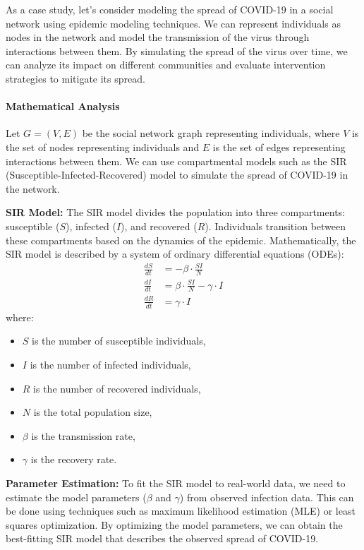 \documentclass[12pt]{book} %
\begin{document}
As a case study, let's consider modeling the spread of COVID-19 in a social network using epidemic modeling techniques. We can represent individuals as nodes in the network and model the transmission of the virus through interactions between them. By simulating the spread of the virus over time, we can analyze its impact on different communities and evaluate intervention strategies to mitigate its spread.

\paragraph{Mathematical Analysis}

Let \(G = (V, E)\) be the social network graph representing individuals, where \(V\) is the set of nodes representing individuals and \(E\) is the set of edges representing interactions between them. We can use compartmental models such as the SIR (Susceptible-Infected-Recovered) model to simulate the spread of COVID-19 in the network.

\textbf{SIR Model:} The SIR model divides the population into three compartments: susceptible (\(S\)), infected (\(I\)), and recovered (\(R\)). Individuals transition between these compartments based on the dynamics of the epidemic. Mathematically, the SIR model is described by a system of ordinary differential equations (ODEs):
\[
\begin{aligned}
\frac{dS}{dt} &= -\beta \cdot \frac{SI}{N} \\
\frac{dI}{dt} &= \beta \cdot \frac{SI}{N} - \gamma \cdot I \\
\frac{dR}{dt} &= \gamma \cdot I
\end{aligned}
\]
where:
\begin{itemize}
    \item \(S\) is the number of susceptible individuals,
    \item \(I\) is the number of infected individuals,
    \item \(R\) is the number of recovered individuals,
    \item \(N\) is the total population size,
    \item \(\beta\) is the transmission rate,
    \item \(\gamma\) is the recovery rate.
\end{itemize}

\textbf{Parameter Estimation:} To fit the SIR model to real-world data, we need to estimate the model parameters (\(\beta\) and \(\gamma\)) from observed infection data. This can be done using techniques such as maximum likelihood estimation (MLE) or least squares optimization. By optimizing the model parameters, we can obtain the best-fitting SIR model that describes the observed spread of COVID-19.
\end{document}
